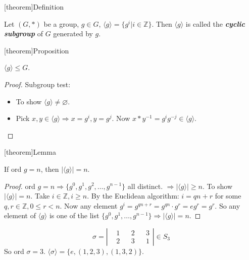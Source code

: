 \documentclass[12pt]{report}
\theoremstyle{definition}
\begin{document}
[theorem]{Definition}
\begin{cyclic subgroup}
    Let $(G, *)$ be a group, $g \in G$, $\langle g\rangle = \{g^{i} | i \in \mathbb{Z}\}$.
    Then $\langle g \rangle$ is called the \textbf{\emph{cyclic subgroup}} of $G$ generated by $g$.
\end{cyclic subgroup}

[theorem]{Proposition}
\begin{cyclic subgroup prop}
    $\langle g \rangle \le G$.
\end{cyclic subgroup prop}

\begin{proof}
    Subgroup test: 
    \begin{itemize}
            \item To show $\langle g\rangle  \neq \varnothing$.
            \item Pick $x,y \in \langle g\rangle  \Rightarrow{} x = g^{i}, y = g^{j}$.
                Now $x * y^{-1} = g^{i}g^{-j} \in \langle g\rangle $.
    \end{itemize}
\end{proof}

[theorem]{Lemma}
\begin{ord of cyclic subgroup}
    If ord $g = n$, then $|\langle g\rangle | = n$.
\end{ord of cyclic subgroup}

\begin{proof}
    ord $g = n \Rightarrow{} \{g^{0}, g^{1}, g^{2}, \ldots, g^{n-1}\}$ all distinct.
    $\Rightarrow{} |\langle g\rangle | \ge n$.
    To show $|\langle g\rangle | = n$. Take $i \in \mathbb{Z}, i \ge n$.
    By the Euclidean algorithm: $i = qn + r$ for some $q, r \in \mathbb{Z}, 0 \le r < n$.
    Now any element $g^{i} = g^{qn + r} = g^{qn} \cdot g^{r} = e g^{r} = g^{r}$.
    So any element of $\langle g\rangle $ is one of the list $\{g^{0}, g^{1}, \ldots, g^{n - 1}\} \Rightarrow{}
    |\langle g\rangle | = n$.
\end{proof}

\begin{ex}
    \[
        \sigma = \left|
        \begin{align*}
            & 1 && 2 && 3 \\
            & 2 && 3 && 1
        \end{align*}
        \right| \in{}S_3
    \]So ord $\sigma = 3$.
    $\langle \sigma \rangle = \{ e, (1, 2, 3), (1, 3, 2)\}$.
\end{ex}
\end{document}
